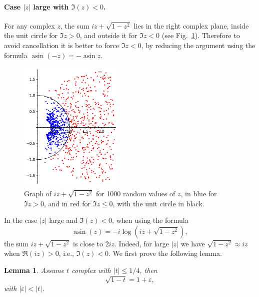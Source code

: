 \documentclass [11pt]{article}
\newcommand {\asin}{\operatorname {asin}}
\renewcommand {\leq}{\leqslant}
\newtheorem{lemma}[theorem]{Lemma}
\begin{document}
\paragraph{Case $|z|$ large with $\Im(z) < 0$.}
For any complex $z$, the sum $iz + \sqrt{1-z^2}$ lies in the right complex
plane, inside the unit circle for $\Im z > 0$, and outside it for $\Im z < 0$
(see Fig.~\ref{fig_asin}).
Therefore to avoid cancellation it is better to force $\Im z < 0$,
by reducing the argument using the formula $\asin (-z) = - \asin z$.
\begin{figure}[htp]

  \centerline{\includegraphics[width=5cm]{fig_asin.pdf}}
  \caption{Graph of $iz + \sqrt{1-z^2}$ for 1000 random values of $z$,
    in blue for $\Im{z} > 0$, and in red for $\Im{z} \le 0$, with the
    unit circle in black.} \label{fig_asin}
\end{figure}  
In the case $|z|$ large and $\Im(z) < 0$, when using the formula
\[ \asin(z) = -i \log (iz + \sqrt{1-z^2}), \]
the sum $iz + \sqrt{1-z^2}$ is close to $2iz$.
Indeed, for large $|z|$ we have $\sqrt{1-z^2} \approx iz$ when
$\Re(iz) > 0$, i.e., $\Im(z) < 0$.
We first prove the following lemma.
\begin{lemma} \label{lemma17}
  Assume $t$ complex with $|t| \leq 1/4$, then
  \[ \sqrt{1-t} = 1 + \varepsilon, \]
  with $|\varepsilon| < |t|$.
\end{lemma}
\end{document}
